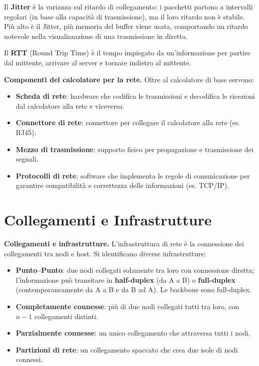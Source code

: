 \documentclass[11pt,a4paper]{report}
\newcommand{\pagemark}[1]{\marginpar{\footnotesize\color{gray}p.#1}}
\begin{document}
Il \textbf{Jitter} è la varianza sul ritardo di collegamento: i pacchetti partono a intervalli regolari (in base alla capacità di trasmissione), ma il loro ritardo non è stabile. Più alto è il Jitter, più memoria del buffer viene usata, comportando un ritardo notevole nella visualizzazione di una trasmissione in diretta.

Il \textbf{RTT} (Round Trip Time) è il tempo impiegato da un'informazione per partire dal mittente, arrivare al server e tornare indietro al mittente.

\textbf{Componenti del calcolatore per la rete.} Oltre al calcolatore di base servono:
\begin{itemize}
\item \textbf{Scheda di rete}: hardware che codifica le trasmissioni e decodifica le ricezioni dal calcolatore alla rete e viceversa.
\item \textbf{Connettore di rete}: connettore per collegare il calcolatore alla rete (es. RJ45).
\item \textbf{Mezzo di trasmissione}: supporto fisico per propagazione e trasmissione dei segnali.
\item \textbf{Protocolli di rete}: software che implementa le regole di comunicazione per garantire compatibilità e correttezza delle informazioni (es. TCP/IP).
\end{itemize}

\section{Collegamenti e Infrastrutture}\pagemark{3}
\textbf{Collegamenti e infrastrutture.} L'infrastruttura di rete è la connessione dei collegamenti tra nodi e host. Si identificano diverse infrastrutture:
\begin{itemize}
\item \textbf{Punto--Punto}: due nodi collegati solamente tra loro con connessione diretta; l'informazione può transitare in \textbf{half-duplex} (da A a B) o \textbf{full-duplex} (contemporaneamente da A a B e da B ad A). Le backbone sono full-duplex.
\item \textbf{Completamente connesse}: più di due nodi collegati tutti tra loro, con $n-1$ collegamenti distinti.
\item \textbf{Parzialmente connesse}: un unico collegamento che attraversa tutti i nodi.
\item \textbf{Partizioni di rete}: un collegamento spaccato che crea due isole di nodi connessi.
\end{itemize}
\end{document}
